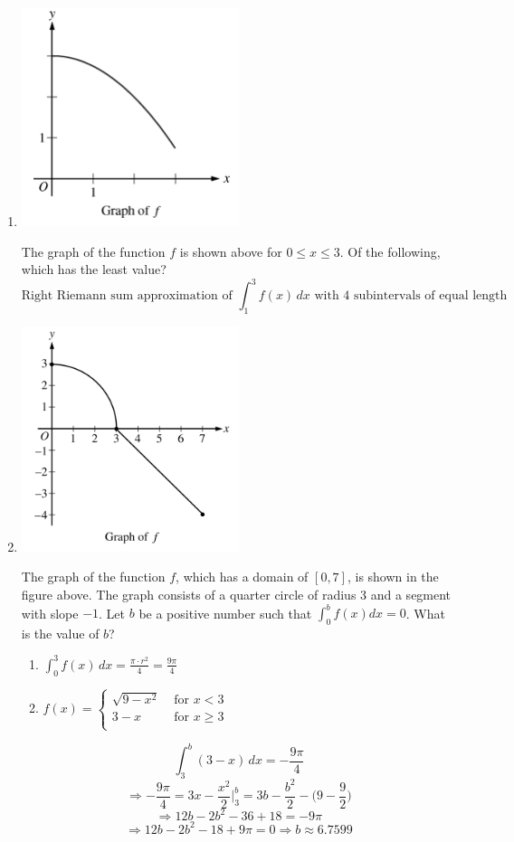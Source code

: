 \documentclass[12pt]{article}
\begin{document}
\begin{enumerate}
\item 
\begin{center}
    \includegraphics[width=2.5in]{original-10.png}
\end{center}
The graph of the function $f$ is shown above for $0 \leq x \leq 3$. Of the following, which has the least value?
$$\boxed{\text{Right Riemann sum approximation of } \int^3_1 f(x)\,dx \text{ with 4 subintervals of equal length}}$$
\item 
\begin{center}
    \includegraphics[width=2.5in]{original-11.png}
\end{center}
The graph of the function $f$, which has a domain of $[0, 7]$, is shown in the figure above. The graph consists of a quarter circle of radius 3 and a segment with slope $-1$. Let $b$ be a positive number such that $\int^b_0 f(x)dx=0$.  What is the value of $b$?
\begin{enumerate}
    \item $\int_0^3 f(x) \, dx = \frac{\pi \cdot r^2}{4}= \frac{9\pi}{4}$
    \item $f(x)=\left\{
\begin{array}{ll}
     \sqrt{9-x^2} & \text{ for } x < 3 \\
      3-x & \text{ for } x \geq 3 \\
\end{array} \right.$
\end{enumerate}
$$\int_{3}^{b} (3-x) \, dx = -\frac{9\pi}{4}$$
$$\Longrightarrow  -\frac{9\pi}{4} =3x-\frac{x^2}{2} \biggr\rvert_{3}^{b} = 3b-\frac{b^2}{2}- \big(9-\frac{9}{2} \big)$$
$$\Longrightarrow 12b-2b^2-36+18=-9\pi $$
$$\Longrightarrow 12b-2b^2-18+9\pi=0 \Longrightarrow \boxed{b\approx 6.7599}$$


\end{enumerate}
\end{document}
